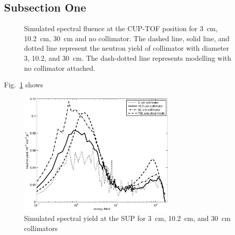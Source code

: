 \documentclass[12pt,journal]{IEEEtran}
\let\MYoriglatexcaption\caption
\renewcommand{\caption}[2][\relax]{\MYoriglatexcaption[#2]{#2}}
\begin{document}
\subsection{Subsection One}
\begin{figure}[!t] 
	\centering    
	\hfil
	\caption{Simulated spectral fluence at the CUP-TOF position for \SI{3}{\cm}, \SI{10.2}{\cm}, \SI{30}{\cm} and no collimator. The dashed line, solid line, and dotted line represent the neutron yield of collimator with diameter 3, 10.2, and \SI{30}{\cm}. The dash-dotted line represents modelling with no collimator attached.}
	\label{fig_LethargylinearspaceFor4collimators}
\end{figure}

Fig.~\ref{fig_LethargylinearspaceFor4collimators} shows 

\begin{figure}[!t] 
	\centering    
	\includegraphics[width=3in]{SUPcomparedlinearspace.eps}
	\caption{Simulated spectral yield at the SUP for \SI{3}{\cm}, \SI{10.2}{\cm}, and \SI{30}{\cm} collimators}
	\label{fig:SUPcomparedlinearspace}
\end{figure}
\end{document}
